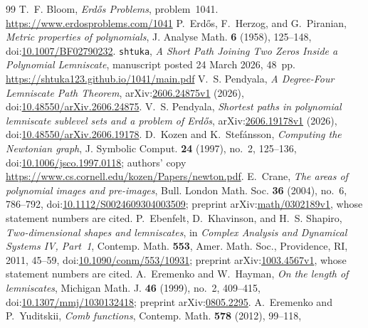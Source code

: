 \documentclass[11pt]{article}
\begin{document}
\begin{thebibliography}{99}
 T.~F. Bloom, \emph{Erd\H{o}s Problems}, problem~1041.
  \url{https://www.erdosproblems.com/1041}
 P.~Erd\H{o}s, F.~Herzog, and G.~Piranian,
  \emph{Metric properties of polynomials}, J. Analyse Math. \textbf{6}
  (1958), 125--148,
  doi:\href{https://doi.org/10.1007/BF02790232}{10.1007/BF02790232}.
 \texttt{shtuka},
  \emph{A Short Path Joining Two Zeros Inside a Polynomial Lemniscate},
  manuscript posted 24 March 2026, 48~pp.
  \url{https://shtuka123.github.io/1041/main.pdf}
 V.~S. Pendyala,
  \emph{A Degree-Four Lemniscate Path Theorem},
  arXiv:\href{https://arxiv.org/abs/2606.24875v1}{2606.24875v1} (2026),
  doi:\href{https://doi.org/10.48550/arXiv.2606.24875}
  {10.48550/arXiv.2606.24875}.
 V.~S. Pendyala,
  \emph{Shortest paths in polynomial lemniscate sublevel sets and a problem
  of Erd\H{o}s}, arXiv:\href{https://arxiv.org/abs/2606.19178v1}{2606.19178v1}
  (2026),
  doi:\href{https://doi.org/10.48550/arXiv.2606.19178}
  {10.48550/arXiv.2606.19178}.
 D.~Kozen and K.~Stef\'ansson,
  \emph{Computing the Newtonian graph}, J. Symbolic Comput. \textbf{24}
  (1997), no.~2, 125--136,
  doi:\href{https://doi.org/10.1006/jsco.1997.0118}{10.1006/jsco.1997.0118};
  authors' copy \url{https://www.cs.cornell.edu/kozen/Papers/newton.pdf}.
 E.~Crane,
  \emph{The areas of polynomial images and pre-images}, Bull. London Math.
  Soc. \textbf{36} (2004), no.~6, 786--792,
  doi:\href{https://doi.org/10.1112/S0024609304003509}{10.1112/S0024609304003509};
  preprint arXiv:\href{https://arxiv.org/abs/math/0302189v1}{math/0302189v1},
  whose statement numbers are cited.
 P.~Ebenfelt, D.~Khavinson, and H.~S. Shapiro,
  \emph{Two-dimensional shapes and lemniscates}, in \emph{Complex Analysis and
  Dynamical Systems IV, Part~1}, Contemp. Math. \textbf{553}, Amer. Math. Soc.,
  Providence, RI, 2011, 45--59,
  doi:\href{https://doi.org/10.1090/conm/553/10931}{10.1090/conm/553/10931};
  preprint arXiv:\href{https://arxiv.org/abs/1003.4567v1}{1003.4567v1},
  whose statement numbers are cited.
 A.~Eremenko and W.~Hayman,
  \emph{On the length of lemniscates}, Michigan Math. J. \textbf{46}
  (1999), no.~2, 409--415,
  doi:\href{https://doi.org/10.1307/mmj/1030132418}{10.1307/mmj/1030132418};
  preprint arXiv:\href{https://arxiv.org/abs/0805.2295}{0805.2295}.
 A.~Eremenko and P.~Yuditskii,
  \emph{Comb functions}, Contemp. Math. \textbf{578} (2012), 99--118,

\end{thebibliography}
\end{document}
